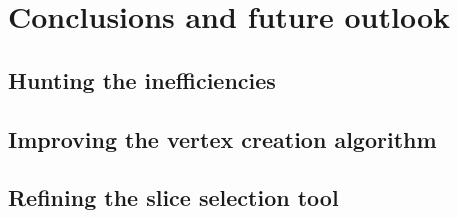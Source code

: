 
\chapter{Conclusions and future outlook}\label{chap:conclusions}


\section{Hunting the inefficiencies}

\section{Improving the vertex creation algorithm}

\begin{figure}
    \centering
    \caption{}
    \label{fig:enter-label}
\end{figure}

\section{Refining the slice selection tool}
